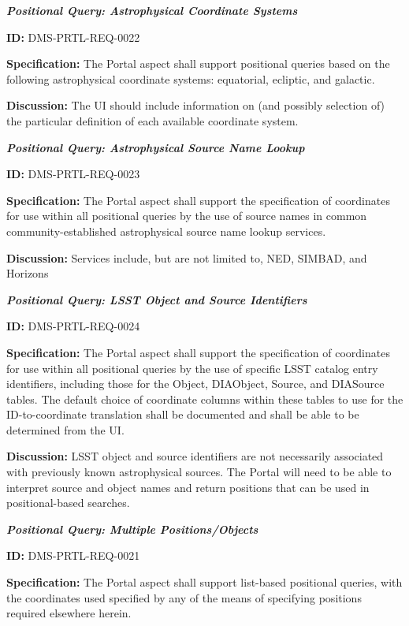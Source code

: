 \documentclass[SE,toc,lsstdraft]{lsstdoc}
\begin{document}
\textbf{\textit{Positional Query: Astrophysical Coordinate Systems}}

\label{DMS-PRTL-REQ-0022}
\textbf{ID:} DMS-PRTL-REQ-0022

\textbf{Specification:}
The Portal aspect shall support positional queries based on the following astrophysical coordinate systems: equatorial, ecliptic, and galactic.

\textbf{Discussion:}
The UI should include information on (and possibly selection of) the particular definition of each available coordinate system.

\textbf{\textit{Positional Query: Astrophysical Source Name Lookup}}

\label{DMS-PRTL-REQ-0023}
\textbf{ID:} DMS-PRTL-REQ-0023

\textbf{Specification:}
The Portal aspect shall support the specification of coordinates for use within all positional queries by the use of source names in common community-established astrophysical source name lookup services.

\textbf{Discussion:}
Services include, but are not limited to, NED, SIMBAD, and Horizons

\textbf{\textit{Positional Query: LSST Object and Source Identifiers}}

\label{DMS-PRTL-REQ-0024}
\textbf{ID:} DMS-PRTL-REQ-0024

\textbf{Specification:}
The Portal aspect shall support the specification of coordinates for use within all positional queries by the use of specific LSST catalog entry identifiers, including those for the Object, DIAObject, Source, and DIASource tables.  The default choice of coordinate columns within these tables to use for the ID-to-coordinate translation shall be documented and shall be able to be determined from the UI.

\textbf{Discussion:}
LSST object and source identifiers are not necessarily associated with previously known astrophysical sources.  The Portal will need to be able to interpret source and object names and return positions that can be used in positional-based searches.

\textbf{\textit{Positional Query: Multiple Positions/Objects}}

\label{DMS-PRTL-REQ-0021}
\textbf{ID:} DMS-PRTL-REQ-0021

\textbf{Specification:}
The Portal aspect shall support list-based positional queries, with the coordinates used specified by any of the means of specifying positions required elsewhere herein.
\end{document}
